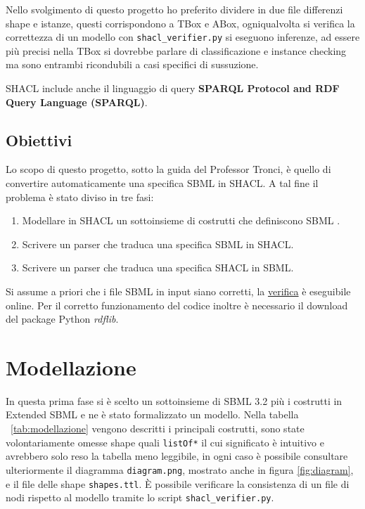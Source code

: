 \documentclass{article}
\begin{document}
Nello svolgimento di questo progetto ho preferito dividere in due file differenzi shape e istanze, questi corrispondono a TBox e ABox, ogniqualvolta si verifica la correttezza di un modello con \texttt{shacl\_verifier.py} si eseguono inferenze, ad essere più precisi nella TBox si dovrebbe parlare di classificazione e instance checking ma sono entrambi ricondubili a casi specifici di sussuzione.

SHACL include anche il linguaggio di query \textbf{SPARQL Protocol and RDF Query Language (SPARQL)}.

\subsection{Obiettivi}

Lo scopo di questo progetto, sotto la guida del Professor Tronci, è quello di convertire automaticamente una specifica SBML in SHACL. A tal fine il problema è stato diviso in tre fasi:

\begin{enumerate}
    \item Modellare in SHACL un sottoinsieme di costrutti che definiscono SBML . 
    \item Scrivere un parser che traduca una specifica SBML in SHACL.
    \item Scrivere un parser che traduca una specifica SHACL in SBML.
\end{enumerate}

Si assume a priori che i file SBML in input siano corretti, la \href{http://sbml.org/Facilities/Validator}{verifica} è eseguibile online. Per il corretto funzionamento del codice inoltre è necessario il download del package Python \textit{rdflib}.

\section{Modellazione}

In questa prima fase si è scelto un sottoinsieme di SBML 3.2 più i costrutti in Extended SBML e ne è stato formalizzato un modello. Nella tabella ~\ref{tab:modellazione} vengono descritti i principali costrutti, sono state volontariamente omesse shape quali \texttt{listOf*} il cui significato è intuitivo e avrebbero solo reso la tabella meno leggibile, in ogni caso è possibile consultare ulteriormente il diagramma \texttt{diagram.png}, mostrato anche in figura \ref{fig:diagram}, e il file delle shape \texttt{shapes.ttl}. È possibile verificare la consistenza di un file di nodi rispetto al modello tramite lo script \texttt{shacl\_verifier.py}.
\end{document}
